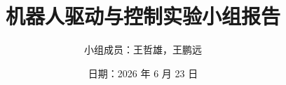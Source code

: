 \documentclass[UTF8,a4paper,12pt]{ctexart}
\title{\textbf{机器人驱动与控制实验小组报告}}
\author{
  小组成员：王哲雄，王鹏远
}
\date{日期：2026 年 6 月 23 日}
\begin{document}
\maketitle
\thispagestyle{empty}
\newpage

\tableofcontents
\newpage











\nocite{opencv,roboticstoolbox,ultralytics}



% 
\end{document}
